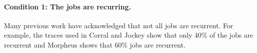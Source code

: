 


\paragraph{Condition 1: The jobs are recurring.}
Many previous work have acknowledged that not all jobs are
recurrent. For example,
the traces used in Corral \cite{corral} and Jockey
\cite{jockey:eurosys2012} show that only 40\% of the jobs are recurrent and
Morpheus \cite{morpheus} shows that 60\% jobs are recurrent.

